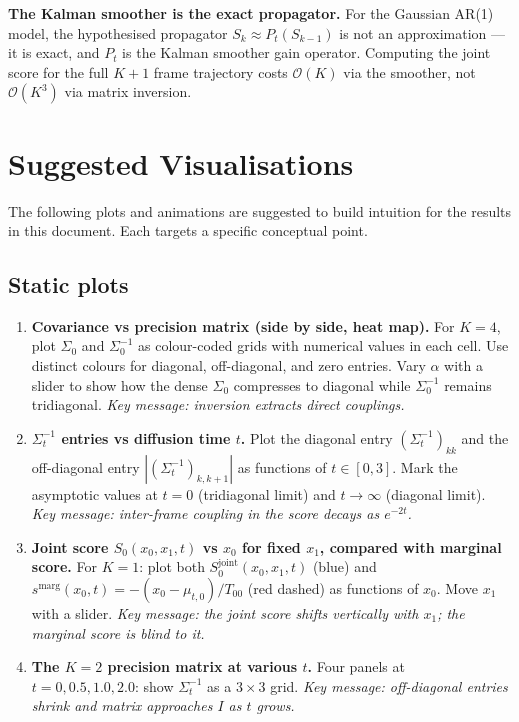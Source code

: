 \documentclass[12pt, a4paper]{article}
\theoremstyle{definition}
\begin{document}
\begin{resultbox}
\textbf{The Kalman smoother is the exact propagator.}
For the Gaussian AR(1) model, the hypothesised propagator
$S_k \approx P_t(S_{k-1})$ is not an approximation — it is exact,
and $P_t$ is the Kalman smoother gain operator. Computing the joint
score for the full $K+1$ frame trajectory costs $\mathcal{O}(K)$
via the smoother, not $\mathcal{O}(K^3)$ via matrix inversion.
\end{resultbox}

\section{Suggested Visualisations}
\label{sec:plots}

The following plots and animations are suggested to build intuition
for the results in this document. Each targets a specific conceptual
point.

\subsection{Static plots}

\begin{enumerate}

  \item \textbf{Covariance vs precision matrix (side by side, heat map).}
    For $K = 4$, plot $\Sigma_0$ and $\Sigma_0^{-1}$ as colour-coded
    grids with numerical values in each cell. Use distinct colours for
    diagonal, off-diagonal, and zero entries. Vary $\alpha$ with a
    slider to show how the dense $\Sigma_0$ compresses to diagonal while
    $\Sigma_0^{-1}$ remains tridiagonal. \textit{Key message: inversion
    extracts direct couplings.}

  \item \textbf{$\Sigma_t^{-1}$ entries vs diffusion time $t$.}
    Plot the diagonal entry $(\Sigma_t^{-1})_{kk}$ and the
    off-diagonal entry $|(\Sigma_t^{-1})_{k,k+1}|$ as functions of
    $t \in [0, 3]$. Mark the asymptotic values at $t=0$ (tridiagonal
    limit) and $t\to\infty$ (diagonal limit). \textit{Key message:
    inter-frame coupling in the score decays as $e^{-2t}$.}

  \item \textbf{Joint score $S_0(x_0,x_1,t)$ vs $x_0$ for fixed $x_1$,
    compared with marginal score.}
    For $K=1$: plot both $S_0^{\text{joint}}(x_0, x_1, t)$ (blue)
    and $s^{\text{marg}}(x_0, t) = -(x_0-\mu_{t,0})/T_{00}$ (red dashed)
    as functions of $x_0$. Move $x_1$ with a slider.
    \textit{Key message: the joint score shifts vertically with $x_1$;
    the marginal score is blind to it.}

  \item \textbf{The $K=2$ precision matrix at various $t$.}
    Four panels at $t = 0, 0.5, 1.0, 2.0$: show $\Sigma_t^{-1}$ as
    a $3\times 3$ grid. \textit{Key message: off-diagonal entries shrink
    and matrix approaches $I$ as $t$ grows.}

\end{enumerate}
\end{document}
